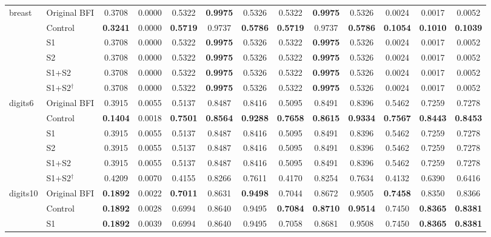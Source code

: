 \documentclass[journal]{IEEEtran}
\begin{document}
\begin{table}[!t]
\begin{tabular}{llccccccccccc}
\midrule
\multirow{6}{*}{breast} & Original BFI & 0.3708 & 0.0000 & 0.5322 & \textbf{0.9975} & 0.5326 & 0.5322 & \textbf{0.9975} & 0.5326 & 0.0024 & 0.0017 & 0.0052 \\
 & Control & \textbf{0.3241} & 0.0000 & \textbf{0.5719} & 0.9737 & \textbf{0.5786} & \textbf{0.5719} & 0.9737 & \textbf{0.5786} & \textbf{0.1054} & \textbf{0.1010} & \textbf{0.1039} \\
 & S1 & 0.3708 & 0.0000 & 0.5322 & \textbf{0.9975} & 0.5326 & 0.5322 & \textbf{0.9975} & 0.5326 & 0.0024 & 0.0017 & 0.0052 \\
 & S2 & 0.3708 & 0.0000 & 0.5322 & \textbf{0.9975} & 0.5326 & 0.5322 & \textbf{0.9975} & 0.5326 & 0.0024 & 0.0017 & 0.0052 \\
 & S1+S2 & 0.3708 & 0.0000 & 0.5322 & \textbf{0.9975} & 0.5326 & 0.5322 & \textbf{0.9975} & 0.5326 & 0.0024 & 0.0017 & 0.0052 \\
 & S1+S2$^{\dagger}$ & 0.3708 & 0.0000 & 0.5322 & \textbf{0.9975} & 0.5326 & 0.5322 & \textbf{0.9975} & 0.5326 & 0.0024 & 0.0017 & 0.0052 \\
\midrule
\multirow{6}{*}{digits6} & Original BFI & 0.3915 & 0.0055 & 0.5137 & 0.8487 & 0.8416 & 0.5095 & 0.8491 & 0.8396 & 0.5462 & 0.7259 & 0.7278 \\
 & Control & \textbf{0.1404} & 0.0018 & \textbf{0.7501} & \textbf{0.8564} & \textbf{0.9288} & \textbf{0.7658} & \textbf{0.8615} & \textbf{0.9334} & \textbf{0.7567} & \textbf{0.8443} & \textbf{0.8453} \\
 & S1 & 0.3915 & 0.0055 & 0.5137 & 0.8487 & 0.8416 & 0.5095 & 0.8491 & 0.8396 & 0.5462 & 0.7259 & 0.7278 \\
 & S2 & 0.3915 & 0.0055 & 0.5137 & 0.8487 & 0.8416 & 0.5095 & 0.8491 & 0.8396 & 0.5462 & 0.7259 & 0.7278 \\
 & S1+S2 & 0.3915 & 0.0055 & 0.5137 & 0.8487 & 0.8416 & 0.5095 & 0.8491 & 0.8396 & 0.5462 & 0.7259 & 0.7278 \\
 & S1+S2$^{\dagger}$ & 0.4209 & 0.0070 & 0.4155 & 0.8266 & 0.7611 & 0.4170 & 0.8254 & 0.7634 & 0.4132 & 0.6390 & 0.6416 \\
\midrule
\multirow{6}{*}{digits10} & Original BFI & \textbf{0.1892} & 0.0022 & \textbf{0.7011} & 0.8631 & \textbf{0.9498} & 0.7044 & 0.8672 & 0.9505 & \textbf{0.7458} & 0.8350 & 0.8366 \\
 & Control & \textbf{0.1892} & 0.0028 & 0.6994 & 0.8640 & 0.9495 & \textbf{0.7084} & \textbf{0.8710} & \textbf{0.9514} & 0.7450 & \textbf{0.8365} & \textbf{0.8381} \\
 & S1 & \textbf{0.1892} & 0.0039 & 0.6994 & 0.8640 & 0.9495 & 0.7058 & 0.8681 & 0.9508 & 0.7450 & \textbf{0.8365} & \textbf{0.8381} \\

\end{tabular}
\end{table}
\end{document}

